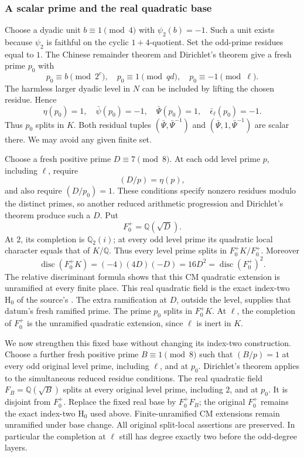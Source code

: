\subsubsection{A scalar prime and the real quadratic base}
Choose a dyadic unit \(b\equiv1\pmod4\) with
\(\psi_2(b)=-1\).
Such a unit exists because \(\psi_2\) is faithful on
the cyclic \(1+4\)-quotient.
Set the odd-prime residues equal to \(1\).
The Chinese remainder theorem and Dirichlet's theorem
give a fresh prime \(p_0\) with
\[
         p_0\equiv b\pmod{2^c},\quad
         p_0\equiv1\pmod{qd},\quad
         p_0\equiv-1\pmod\ell .
\]
The harmless larger dyadic level in \(N\) can be included
by lifting the chosen residue.
Hence
\[
       \eta(p_0)=1,\quad
       \bar\psi(p_0)=-1,\quad
       \bar\Psi(p_0)=1,\quad
       \bar\epsilon_\ell(p_0)=-1 .
 \tag{G2}
\]
Thus \(p_0\) splits in \(K\).
Both residual tuples
\((\bar\Psi,\bar\Psi^{-1})\) and
\((\bar\Psi,1,\bar\Psi^{-1})\) are scalar there.
We may avoid any given finite set.

Choose a fresh positive prime \(D\equiv7\pmod8\).
At each odd level prime \(p\), including \(\ell\),
require
\[
                   (D/p)=\eta(p),
\]
and also require \((D/p_0)=1\).
These conditions specify nonzero residues modulo the
distinct primes, so another reduced arithmetic progression
and Dirichlet's theorem produce such a \(D\).
Put
\[
                       F_0^+=\mathbb Q(\sqrt D).
\]
At \(2\), its completion is \(\mathbb Q_2(i)\);
at every odd level prime its quadratic local character
equals that of \(K/\mathbb Q\).
Thus every level prime splits in
\(F_0^+K/F_0^+\).
Moreover
\[
 \operatorname{disc}(F_0^+K)
        =(-4)(4D)(-D)=16D^2
                     =\operatorname{disc}(F_0^+)^2 .
\]
The relative discriminant formula shows that this CM
quadratic extension is unramified at every finite place.
This real quadratic field is the exact index-two
\(\mathrm{H}_0\) of the source's
.
The extra ramification at \(D\), outside the level,
supplies that datum's fresh ramified prime.
The prime \(p_0\) splits in \(F_0^+K\).
At \(\ell\), the completion of \(F_0^+\) is the
unramified quadratic extension, since \(\ell\) is
inert in \(K\).

We now strengthen this fixed base without changing its
index-two construction.
Choose a further fresh positive prime \(B\equiv1\pmod8\)
such that \((B/p)=1\) at every odd original level
prime, including \(\ell\), and at \(p_0\).
Dirichlet's theorem applies to the simultaneous reduced
residue conditions.
The real quadratic field \(F_B=\mathbb Q(\sqrt B)\)
splits at every original level prime, including \(2\),
and at \(p_0\).
It is disjoint from \(F_0^+\).
Replace the fixed real base by \(F_0^+F_B\);
the original \(F_0^+\) remains the exact index-two
\(\mathrm H_0\) used above.
Finite-unramified CM extensions remain unramified under
base change.
All original split-local assertions are preserved.
In particular the completion at \(\ell\) still has
degree exactly two before the odd-degree layers.

